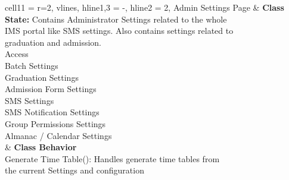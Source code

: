 \documentclass[11pt]{article}
\begin{document}
\begin{longtblr}[
  label = none,
  entry = none,
]{
  cell{1}{1} = {r=2}{},
  vlines,
  hline{1,3} = {-}{},
  hline{2} = {2}{},
}
Admin Settings Page & {\textbf{Class State: }Contains Administrator Settings related to the whole\\ IMS
portal like SMS settings. Also contains settings related to \\graduation and admission.\\
\hspace{\dimexpr\labelsep+0.5\tabcolsep}Access\\
\hspace{\dimexpr\labelsep+0.5\tabcolsep}Batch Settings\\
\hspace{\dimexpr\labelsep+0.5\tabcolsep}Graduation Settings\\
\hspace{\dimexpr\labelsep+0.5\tabcolsep}Admission Form Settings\\
\hspace{\dimexpr\labelsep+0.5\tabcolsep}SMS Settings\\
\hspace{\dimexpr\labelsep+0.5\tabcolsep}SMS Notification Settings\\
\hspace{\dimexpr\labelsep+0.5\tabcolsep}Group Permissions Settings\\
\hspace{\dimexpr\labelsep+0.5\tabcolsep}Almanac / Calendar Settings} \\
                    & {\textbf{Class Behavior}\\\hspace{\dimexpr\labelsep+0.5\tabcolsep}
Generate Time Table(): Handles generate time tables from \\the current Settings and configuration}
\end{longtblr}
\end{document}
